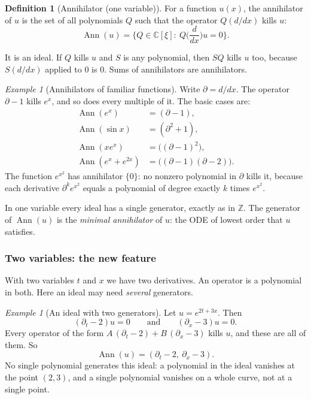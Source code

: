 \documentclass[11pt]{article}
\theoremstyle{plain}
\theoremstyle{definition}
\newtheorem{definition}[theorem]{Definition}
\theoremstyle{remark}
\newtheorem{example}[theorem]{Example}
\newcommand{\C}{\mathbb{C}}
\newcommand{\Z}{\mathbb{Z}}
\DeclareMathOperator{\Ann}{Ann}             %
\begin{document}
\begin{definition}[{Annihilator (one variable)}]
For a function $u(x)$, the annihilator of $u$ is the set of all polynomials $Q$ such that the operator $Q(d/dx)$ kills $u$:
\[
\Ann(u)=\Big\{Q\in\C[\xi]:\ Q\Big(\frac{d}{dx}\Big)u=0\Big\}.
\]
\end{definition}

It is an ideal. If $Q$ kills $u$ and $S$ is any polynomial, then $SQ$ kills $u$ too, because $S(d/dx)$ applied to $0$ is $0$. Sums of annihilators are annihilators.

\begin{example}[{Annihilators of familiar functions}]
Write $\partial=d/dx$. The operator $\partial-1$ kills $e^x$, and so does every multiple of it. The basic cases are:
\begin{align*}
\Ann(e^x)&=(\partial-1),\\
\Ann(\sin x)&=(\partial^2+1),\\
\Ann(xe^x)&=\big((\partial-1)^2\big),\\
\Ann(e^x+e^{2x})&=\big((\partial-1)(\partial-2)\big).
\end{align*}
The function $e^{x^2}$ has annihilator $\{0\}$: no nonzero polynomial in $\partial$ kills it, because each derivative $\partial^ke^{x^2}$ equals a polynomial of degree exactly $k$ times $e^{x^2}$.
\end{example}

In one variable every ideal has a single generator, exactly as in $\Z$. The generator of $\Ann(u)$ is the \emph{minimal annihilator} of $u$: the ODE of lowest order that $u$ satisfies.

\subsubsection{Two variables: the new feature}

With two variables $t$ and $x$ we have two derivatives. An operator is a polynomial in both. Here an ideal may need \emph{several} generators.

\begin{example}[{An ideal with two generators}]
Let $u=e^{2t+3x}$. Then
\[
(\partial_t-2)u=0\qquad\text{and}\qquad(\partial_x-3)u=0 .
\]
Every operator of the form $A\,(\partial_t-2)+B\,(\partial_x-3)$ kills $u$, and these are all of them. So
\[
\Ann(u)=(\partial_t-2,\ \partial_x-3).
\]
No single polynomial generates this ideal: a polynomial in the ideal vanishes at the point $(2,3)$, and a single polynomial vanishes on a whole curve, not at a single point.
\end{example}
\end{document}
